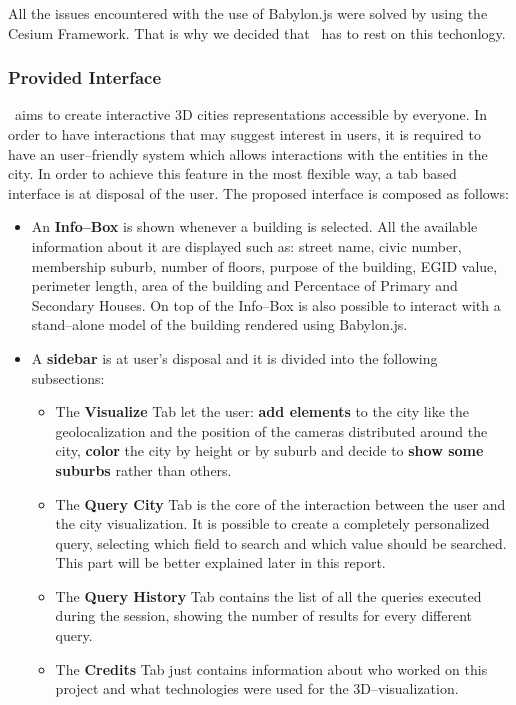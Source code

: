 All the issues encountered with the use of Babylon.js were solved by using the Cesium Framework. That is why we decided that \applicationName\ has to rest on this techonlogy.   
\subsubsection{Provided Interface}
\applicationName\ aims to create interactive 3D cities representations accessible by everyone. In order to have interactions that may suggest interest in users, it is required to have an user--friendly system which allows interactions with the entities in the city. In order to achieve this feature in the most flexible way, a tab based interface is at disposal of the user. The proposed interface is composed as follows:
\begin{itemize}
	\item An {\bf Info--Box} is shown whenever a building is selected. All the available information about it are displayed such as: street name, civic number, membership suburb, number of floors, purpose of the building, EGID value, perimeter length, area of the building and Percentace of Primary and Secondary Houses. On top of the Info--Box is also possible to interact with a stand--alone model of the building rendered using Babylon.js.
	\item A {\bf sidebar} is at user's disposal and it is divided into the following subsections:
	\begin{itemize}
		\item The {\bf Visualize} Tab let the user: {\bf add elements} to the city like the geolocalization and the position of the cameras distributed around the city, {\bf color} the city by height or by suburb and decide to {\bf show some suburbs} rather than others.
		\item The {\bf Query City} Tab is the core of the interaction between the user and the city visualization. It is possible to create a completely personalized query, selecting which field to search and which value should be searched. This part will be better explained later in this report.
		\item The {\bf Query History} Tab contains the list of all the queries executed during the session, showing the number of results for every different query.
		\item The {\bf Credits} Tab just contains information about who worked on this project and what technologies were used for the 3D--visualization.
	\end{itemize}
\end{itemize}
